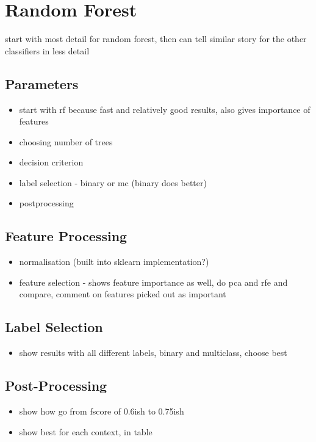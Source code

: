 \section{Random Forest}
\label{sec:exp-rf}
    start with most detail for random forest, then can tell similar story for the other classifiers in less detail
    \subsection{Parameters}
    \label{subsec:exp-rf-param}
        \begin{itemize}
            \item{start with rf because fast and relatively good results, also gives importance of features}
            \item{choosing number of trees}
            \item{decision criterion}
            
            \item{label selection - binary or mc (binary does better)}
            \item{postprocessing}
        \end{itemize}
    
    \subsection{Feature Processing}
    \label{subsec:rf-feats}
        \begin{itemize}
            \item{normalisation (built into sklearn implementation?)}
            \item{feature selection - shows feature importance as well, do pca and rfe and compare, comment on features picked out as important}
        \end{itemize}
    
    \subsection{Label Selection}
    \label{subsec:rf-labels}
        \begin{itemize}
            \item{show results with all different labels, binary and multiclass, choose best}
        \end{itemize}
        
    \subsection{Post-Processing}
    \label{subsec:rf-postproc}
        \begin{itemize}
            \item{show how go from fscore of 0.6ish to 0.75ish}
            \item{show best for each context, in table}
        \end{itemize}